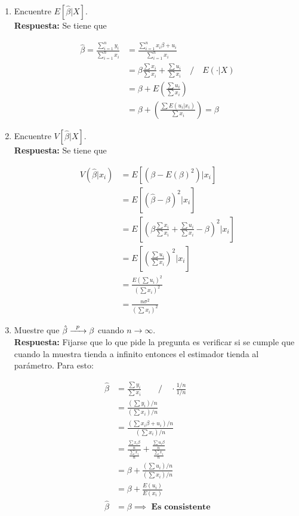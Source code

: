 \documentclass{exam}
\begin{document}
\begin{enumerate}
    \item Encuentre $E[\hat{\beta}|X]$.\\

    \textbf{Respuesta:} Se tiene que

    \begin{align*}
        \hat{\beta} = \frac{\sum_{i=1}^n y_i}{\sum_{i=1}^n x_i} &= \frac{\sum_{i=1}^n x_i \beta + u_i}{\sum_{i=1}^n x_i}\\
        &= \beta \frac{\sum x_i}{\sum x_i} + \frac{\sum u_i}{\sum x_i} \quad / \quad E(\cdot|X)\\
        &= \beta + E \left(\frac{\sum u_i}{\sum x_i} \right)\\
        &= \beta + \left(\frac{\sum E(u_i|x_i)}{\sum x_i} \right) = \beta
    \end{align*}

    \item Encuentre $V[\hat{\beta}|X]$.\\

    \textbf{Respuesta:} Se tiene que 

    \begin{align*}
        V(\hat{\beta}|x_i) &= E \left[(\beta - E(\beta)^2)|x_i \right]\\
        &= E\left[(\hat{\beta} - \beta)^2 | x_i\right]\\
        &= E\left[\left(\beta \frac{\sum x_i}{\sum x_i} + \frac{\sum u_i}{\sum x_i} - \beta\right)^2 |x_i\right]\\
        &= E \left[\left(\frac{\sum u_i}{\sum x_i}\right)^2 |x_i\right]\\
        &= \frac{E (\sum u_i)^2}{(\sum x_i)^2}\\
        &= \frac{n \sigma^2}{(\sum x_i)^2}
    \end{align*}

    
    \item Muestre que $\hat{\beta} \xrightarrow{\enskip p\enskip} \beta$ cuando $n \longrightarrow \infty$. \\

    \textbf{Respuesta:} Fijarse que lo que pide la pregunta es verificar si se cumple que cuando la muestra tienda a infinito entonces el estimador tienda al parámetro. Para esto:

    \begin{align*}
        \hat{\beta} &= \frac{\sum y_i}{\sum x_i} \qquad / \quad \cdot \frac{1/n}{1/n}\\
        &= \frac{(\sum y_i)/n}{(\sum x_i)/n}\\
        &= \frac{(\sum x_i \beta + u_i)/n}{(\sum x_i)/n}\\
        &= \frac{\frac{\sum x_i \beta}{n}}{\frac{\sum x_i}{n}} + \frac{\frac{\sum u_i \beta}{n}}{\frac{\sum x_i}{n}}\\
        &= \beta + \frac{(\sum u_i)/n}{(\sum x_i)/n}\\
        &= \beta + \frac{E(u_i)}{E(x_i)}\\
        \hat{\beta} &= \beta \implies \textbf{ Es consistente}
    \end{align*}
     

\end{enumerate}
\end{document}
